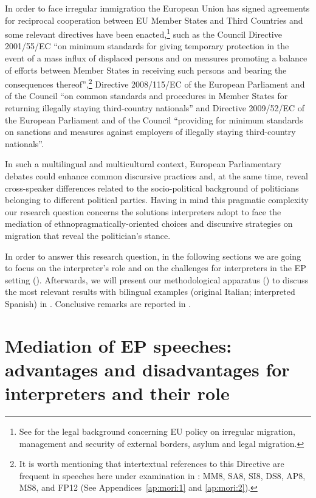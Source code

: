 \documentclass[output=paper]{langscibook}
\begin{document}
In order to face irregular immigration the European Union has signed agreements for reciprocal cooperation between EU Member States and Third Countries and some relevant directives have been enacted,\footnote{See \citet{DiGiambattistaEtAl2015} for the legal background concerning EU policy on irregular migration, management and security of external borders, asylum and legal migration.} such as the Council Directive 2001/55/EC “on minimum standards for giving temporary protection in the event of a mass influx of displaced persons and on measures promoting a balance of efforts between Member States in receiving such persons and bearing the consequences thereof”,\footnote{It is worth mentioning that intertextual references to this Directive are frequent in speeches here under examination in : MM8, SA8, SI8, DS8, AP8, MS8, and FP12 (See Appendices~\ref{ap:mori:1} and \ref{ap:mori:2}).} Directive 2008/115/EC of the European Parliament and of the Council “on common standards and procedures in Member States for returning illegally staying third-country nationals” and Directive 2009/52/EC of the European Parliament and of the Council “providing for minimum standards on sanctions and measures against employers of illegally staying third-country nationals”.

In such a multilingual and multicultural context, European Parliamentary debates could enhance common discursive practices and, at the same time, reveal cross-speaker differences related to the socio-political background of politicians belonging to different political parties. Having in mind this pragmatic complexity our research question concerns the solutions interpreters adopt to face the mediation of ethnopragmatically-oriented choices and discursive strategies on migration that reveal the politician’s stance.

In order to answer this research question, in the following sections we are going to focus on the interpreter’s role and on the challenges for interpreters in the EP setting (). Afterwards, we will present our methodological apparatus () to discuss the most relevant results with bilingual examples (original Italian; interpreted Spanish) in . Conclusive remarks are reported in .



\section{Mediation of EP speeches: advantages and disadvantages for interpreters and their role}\label{sec:mori:2}
\end{document}
